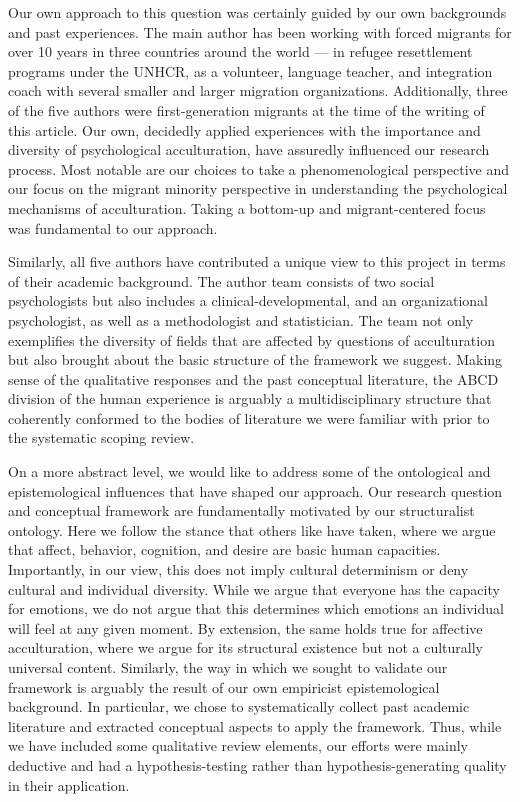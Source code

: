 \documentclass[man, 12pt, a4paper, mask]{apa7}
\begin{document}
Our own approach to this question was certainly guided by our own backgrounds and past experiences. The main author has been working with forced migrants for over 10 years in three countries around the world --- in refugee resettlement programs under the UNHCR, as a volunteer, language teacher, and integration coach with several smaller and larger migration organizations. Additionally, three of the five authors were first-generation migrants at the time of the writing of this article. Our own, decidedly applied experiences with the importance and diversity of psychological acculturation, have assuredly influenced our research process. Most notable are our choices to take a phenomenological perspective and our focus on the migrant minority perspective in understanding the psychological mechanisms of acculturation. Taking a bottom-up and migrant-centered focus was fundamental to our approach.

Similarly, all five authors have contributed a unique view to this project in terms of their academic background. The author team consists of two social psychologists but also includes a clinical-developmental, and an organizational psychologist, as well as a methodologist and statistician. The team not only exemplifies the diversity of fields that are affected by questions of acculturation but also brought about the basic structure of the framework we suggest. Making sense of the qualitative responses and the past conceptual literature, the ABCD division of the human experience is arguably a multidisciplinary structure that coherently conformed to the bodies of literature we were familiar with prior to the systematic scoping review. 

On a more abstract level, we would like to address some of the ontological and epistemological influences that have shaped our approach. Our research question and conceptual framework are fundamentally motivated by our structuralist ontology. Here we follow the stance that others like \citet[][]{Berry2009a} have taken, where we argue that affect, behavior, cognition, and desire are basic human capacities. Importantly, in our view, this does not imply cultural determinism or deny cultural and individual diversity. While we argue that everyone has the capacity for emotions, we do not argue that this determines which emotions an individual will feel at any given moment. By extension, the same holds true for affective acculturation, where we argue for its structural existence but not a culturally universal content. Similarly, the way in which we sought to validate our framework is arguably the result of our own empiricist epistemological background. In particular, we chose to systematically collect past academic literature and extracted conceptual aspects to apply the framework. Thus, while we have included some qualitative review elements, our efforts were mainly deductive and had a hypothesis-testing rather than hypothesis-generating quality in their application.
\end{document}
